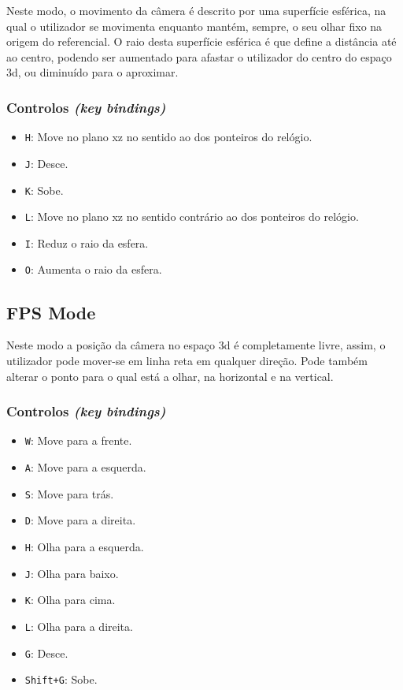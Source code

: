 \documentclass[a4paper]{article}
\begin{document}
Neste modo, o movimento da câmera é descrito por uma superfície esférica, na qual o utilizador se movimenta enquanto mantém, sempre, o seu olhar fixo na origem do referencial. O raio desta superfície esférica é que define a distância até ao centro, podendo ser aumentado para afastar o utilizador do centro do espaço 3d, ou diminuído para o aproximar.

\subsubsection{Controlos \textit{(key bindings)}}

\begin{itemize}
    \item \texttt{H}: Move no plano xz no sentido ao dos ponteiros do relógio.
    \item \texttt{J}: Desce.
    \item \texttt{K}: Sobe.
    \item \texttt{L}: Move no plano xz no sentido contrário ao dos ponteiros do relógio.
    \item \texttt{I}: Reduz o raio da esfera.
    \item \texttt{O}: Aumenta o raio da esfera.
\end{itemize}

\subsection{FPS Mode}

Neste modo a posição da câmera no espaço 3d é completamente livre, assim, o utilizador pode mover-se em linha reta em qualquer direção. Pode também alterar o ponto para o qual está a olhar, na horizontal e na vertical.

\subsubsection{Controlos \textit{(key bindings)}}

\begin{itemize}
    \item \texttt{W}: Move para a frente.
    \item \texttt{A}: Move para a esquerda.
    \item \texttt{S}: Move para trás.
    \item \texttt{D}: Move para a direita.
    \item \texttt{H}: Olha para a esquerda.
    \item \texttt{J}: Olha para baixo.
    \item \texttt{K}: Olha para cima.
    \item \texttt{L}: Olha para a direita.
    \item \texttt{G}: Desce.
    \item \texttt{Shift+G}: Sobe.
\end{itemize}
\end{document}
